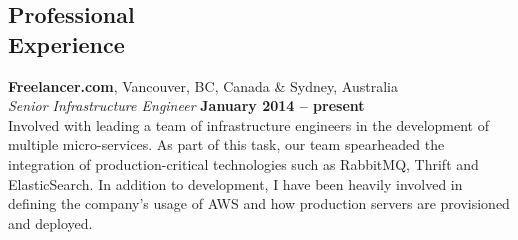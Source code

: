\documentclass[margin,line]{resume}
\begin{document}
\begin{resume}







    \section{\mysidestyle Professional\\Experience}
    \textbf{Freelancer.com}, Vancouver, BC, Canada \& Sydney, Australia \vspace{2mm}\\\vspace{1mm}%
    \textsl{Senior Infrastructure Engineer} \hfill \textbf{January 2014 -- present}\\
    Involved with leading a team of infrastructure engineers in the development of multiple micro-services. As part of this task, our team 
    spearheaded the integration of production-critical technologies such as RabbitMQ, Thrift and ElasticSearch. In addition to development,
    I have been heavily involved in defining the company's usage of AWS and how production servers are provisioned and deployed.
    

\end{resume}
\end{document}
